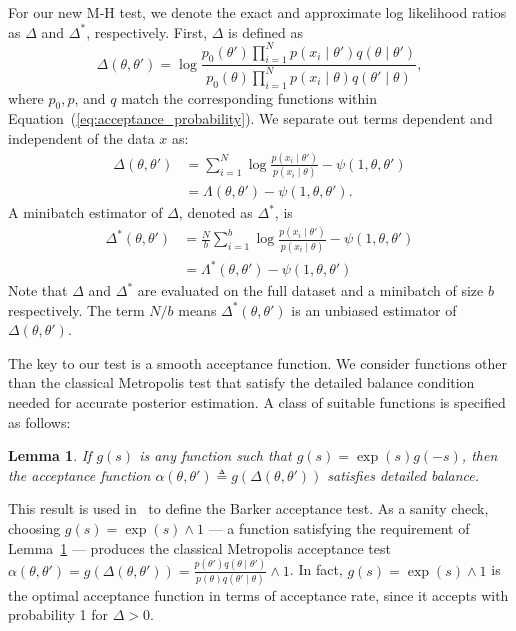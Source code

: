 \documentclass[twoside]{article} \usepackage{aistats2017}
\newtheorem{lemma}{Lemma}
\begin{document}
For our new M-H test, we denote the exact and approximate log likelihood ratios
as $\Delta$ and $\Delta^*$, respectively. First, $\Delta$ is defined as
\begin{equation}\label{eq:delta1}
    \Delta(\theta,\theta')  =
    \log \frac{p_0(\theta')\prod_{i=1}^N p(x_i \mid \theta')q(\theta \mid
    \theta')}{p_0(\theta)\prod_{i=1}^N p(x_i \mid \theta)q(\theta' \mid\theta)},
\end{equation}
where $p_0, p$, and $q$ match the corresponding functions within
Equation~(\ref{eq:acceptance_probability}). We separate out terms dependent and
independent of the data $x$ as:
\begin{equation}\label{eq:delta2}
\begin{split}
    \Delta(\theta,\theta') &= \sum_{i=1}^N\log\frac{p(x_i\mid\theta')}{p(x_i\mid\theta)} - \psi(1,\theta,\theta') \\
    & = \Lambda(\theta,\theta') - \psi(1,\theta,\theta').
\end{split}
\end{equation}
A minibatch estimator of $\Delta$, denoted as $\Delta^*$, is
\begin{equation}\label{eq:delta3}
\begin{split}
    \Delta^*(\theta,\theta') &=
\frac{N}{b}\sum_{i=1}^b\log\frac{p(x_i\mid\theta')}{p(x_i\mid\theta)} - \psi(1,\theta,\theta')\\
&=\Lambda^*(\theta,\theta') - \psi(1,\theta,\theta')
\end{split}
\end{equation}
Note that $\Delta$ and $\Delta^*$ are evaluated on the full dataset and a
minibatch of size $b$ respectively. The term $N/b$ means
$\Delta^*(\theta,\theta')$ is an unbiased estimator of $\Delta(\theta,\theta')$.

The key to our test is a smooth acceptance function.  We consider functions
other than the classical Metropolis test that satisfy the detailed balance
condition needed for accurate posterior estimation. A class of suitable
functions is specified as follows:

\begin{lemma}\label{lem:detailed_balance}
    If $g(s)$ is any function such that $g(s) = \exp(s) g(-s)$, then the
    acceptance function $\alpha(\theta,\theta') \triangleq
    g(\Delta(\theta,\theta'))$ satisfies detailed balance.
\end{lemma}

This result is used in~\citet{Barker65} to define the Barker acceptance test.  As
a sanity check, choosing $g(s) = \exp(s) \wedge 1$ --- a function satisfying the
requirement of Lemma~\ref{lem:detailed_balance} --- produces the classical
Metropolis acceptance test $\alpha(\theta,\theta') = g(\Delta(\theta,\theta')) =
\frac{p(\theta')q(\theta \mid \theta')}{p(\theta)q(\theta' \mid \theta)}\wedge
1$. In fact, $g(s) =\exp(s) \wedge 1$ is the optimal acceptance function in
terms of acceptance rate, since it accepts with probability 1 for $\Delta > 0$.
\end{document}
